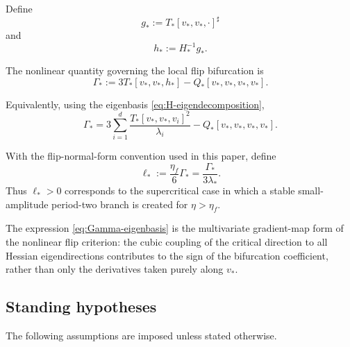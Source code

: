Define
\begin{equation}
g_*
:=
T_*[v_*,v_*,\cdot]^\sharp
\label{eq:g-star}
\end{equation}
and
\begin{equation}
h_*
:=
H_*^{-1}g_*.
\label{eq:h-star}
\end{equation}

The nonlinear quantity governing the local flip bifurcation is
\begin{equation}
\Gamma_*
:=
3T_*[v_*,v_*,h_*]
-
Q_*[v_*,v_*,v_*,v_*].
\label{eq:Gamma-star}
\end{equation}

Equivalently, using the eigenbasis
\eqref{eq:H-eigendecomposition},
\begin{equation}
\Gamma_*
=
3
\sum_{i=1}^d
\frac{
T_*[v_*,v_*,v_i]^2
}{
\lambda_i
}
-
Q_*[v_*,v_*,v_*,v_*].
\label{eq:Gamma-eigenbasis}
\end{equation}

With the flip-normal-form convention used in this paper, define
\begin{equation}
\ell_*
:=
\frac{\eta_f}{6}\Gamma_*
=
\frac{\Gamma_*}{3\lambda_*}.
\label{eq:ell-star}
\end{equation}
Thus $\ell_*>0$ corresponds to the supercritical case in which a
stable small-amplitude period-two branch is created for
$\eta>\eta_f$.

The expression \eqref{eq:Gamma-eigenbasis} is the multivariate
gradient-map form of the nonlinear flip criterion: the cubic
coupling of the critical direction to all Hessian eigendirections
contributes to the sign of the bifurcation coefficient, rather than
only the derivatives taken purely along $v_*$.

\subsection{Standing hypotheses}
\label{subsec:standing-hypotheses}

The following assumptions are imposed unless stated otherwise.

